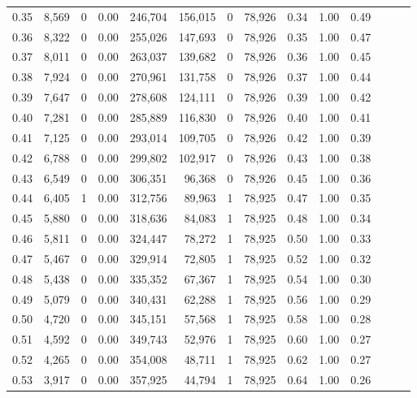 \begin{tabular}{rrrrrrrrrrrrrr}
0.35 &  8,569 &      0 &  0.00 &  246,704 &  156,015 &       0 &  78,926 &  0.34 &  1.00 &      0.49 \\
0.36 &  8,322 &      0 &  0.00 &  255,026 &  147,693 &       0 &  78,926 &  0.35 &  1.00 &      0.47 \\
0.37 &  8,011 &      0 &  0.00 &  263,037 &  139,682 &       0 &  78,926 &  0.36 &  1.00 &      0.45 \\
0.38 &  7,924 &      0 &  0.00 &  270,961 &  131,758 &       0 &  78,926 &  0.37 &  1.00 &      0.44 \\
0.39 &  7,647 &      0 &  0.00 &  278,608 &  124,111 &       0 &  78,926 &  0.39 &  1.00 &      0.42 \\
0.40 &  7,281 &      0 &  0.00 &  285,889 &  116,830 &       0 &  78,926 &  0.40 &  1.00 &      0.41 \\
0.41 &  7,125 &      0 &  0.00 &  293,014 &  109,705 &       0 &  78,926 &  0.42 &  1.00 &      0.39 \\
0.42 &  6,788 &      0 &  0.00 &  299,802 &  102,917 &       0 &  78,926 &  0.43 &  1.00 &      0.38 \\
0.43 &  6,549 &      0 &  0.00 &  306,351 &   96,368 &       0 &  78,926 &  0.45 &  1.00 &      0.36 \\
0.44 &  6,405 &      1 &  0.00 &  312,756 &   89,963 &       1 &  78,925 &  0.47 &  1.00 &      0.35 \\
0.45 &  5,880 &      0 &  0.00 &  318,636 &   84,083 &       1 &  78,925 &  0.48 &  1.00 &      0.34 \\
0.46 &  5,811 &      0 &  0.00 &  324,447 &   78,272 &       1 &  78,925 &  0.50 &  1.00 &      0.33 \\
0.47 &  5,467 &      0 &  0.00 &  329,914 &   72,805 &       1 &  78,925 &  0.52 &  1.00 &      0.32 \\
0.48 &  5,438 &      0 &  0.00 &  335,352 &   67,367 &       1 &  78,925 &  0.54 &  1.00 &      0.30 \\
0.49 &  5,079 &      0 &  0.00 &  340,431 &   62,288 &       1 &  78,925 &  0.56 &  1.00 &      0.29 \\
0.50 &  4,720 &      0 &  0.00 &  345,151 &   57,568 &       1 &  78,925 &  0.58 &  1.00 &      0.28 \\
0.51 &  4,592 &      0 &  0.00 &  349,743 &   52,976 &       1 &  78,925 &  0.60 &  1.00 &      0.27 \\
0.52 &  4,265 &      0 &  0.00 &  354,008 &   48,711 &       1 &  78,925 &  0.62 &  1.00 &      0.27 \\
0.53 &  3,917 &      0 &  0.00 &  357,925 &   44,794 &       1 &  78,925 &  0.64 &  1.00 &      0.26 \\

\end{tabular}
